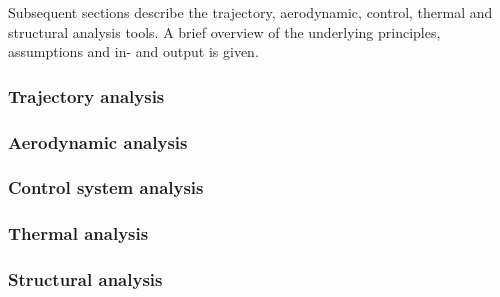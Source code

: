 Subsequent sections describe the trajectory, aerodynamic, control, thermal and structural analysis tools. A brief overview of the underlying principles, assumptions and in- and output is given.
\subsubsection{Trajectory analysis}\label{subsec:orbittool}


\subsubsection{Aerodynamic analysis}\label{subsec:aerotool}


\subsubsection{Control system analysis}\label{subsec:controltool}


\subsubsection{Thermal analysis}\label{subsec:thermaltool}


\subsubsection{Structural analysis}\label{subsec:structool}







